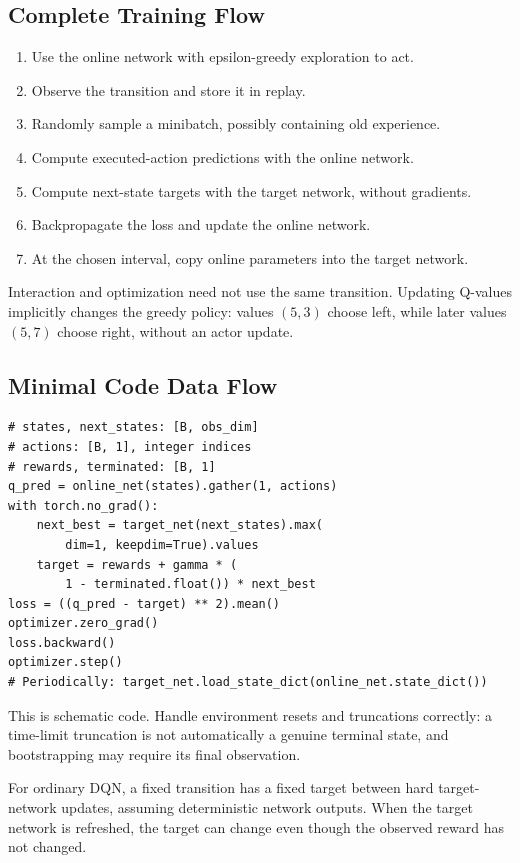 \subsection{Complete Training Flow}
\begin{enumerate}
\item Use the online network with epsilon-greedy exploration to act.
\item Observe the transition and store it in replay.
\item Randomly sample a minibatch, possibly containing old experience.
\item Compute executed-action predictions with the online network.
\item Compute next-state targets with the target network, without gradients.
\item Backpropagate the loss and update the online network.
\item At the chosen interval, copy online parameters into the target network.
\end{enumerate}
Interaction and optimization need not use the same transition.
Updating Q-values implicitly changes the greedy policy: values $(5,3)$
choose left, while later values $(5,7)$ choose right, without an actor update.

\subsection{Minimal Code Data Flow}
\begin{verbatim}
# states, next_states: [B, obs_dim]
# actions: [B, 1], integer indices
# rewards, terminated: [B, 1]
q_pred = online_net(states).gather(1, actions)
with torch.no_grad():
    next_best = target_net(next_states).max(
        dim=1, keepdim=True).values
    target = rewards + gamma * (
        1 - terminated.float()) * next_best
loss = ((q_pred - target) ** 2).mean()
optimizer.zero_grad()
loss.backward()
optimizer.step()
# Periodically: target_net.load_state_dict(online_net.state_dict())
\end{verbatim}
This is schematic code. Handle environment resets and truncations
correctly: a time-limit truncation is not automatically a genuine
terminal state, and bootstrapping may require its final observation.

\begin{pitfall}
For ordinary DQN, a fixed transition has a fixed target between
hard target-network updates, assuming deterministic network outputs.
When the target network is refreshed, the target can change even
though the observed reward has not changed.
\end{pitfall}


